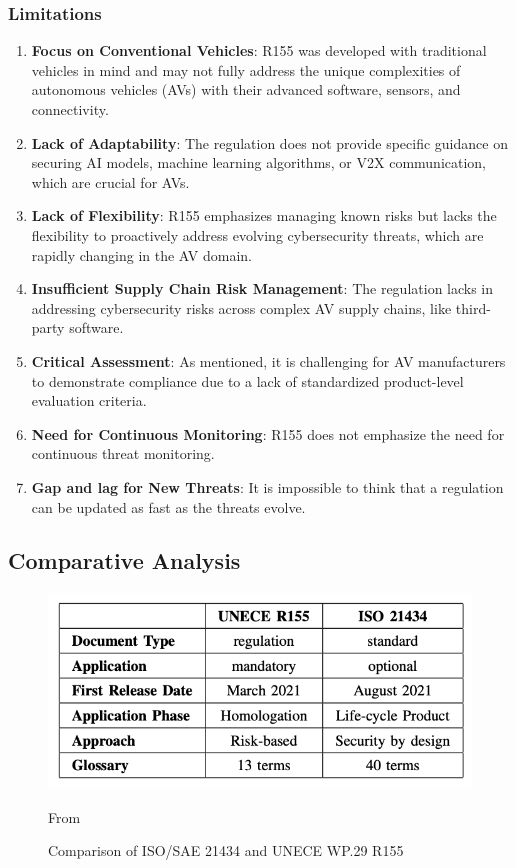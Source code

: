 \subsubsection{Limitations}\label{subsubsec:limitations-2}
\begin{enumerate}
    \item \textbf{Focus on Conventional Vehicles}: R155 was developed with traditional vehicles in mind and may not fully address the unique complexities of autonomous vehicles (AVs) with their advanced software, sensors, and connectivity.
    \item \textbf{Lack of Adaptability}: The regulation does not provide specific guidance on securing AI models, machine learning algorithms, or V2X communication, which are crucial for AVs.
    \item \textbf{Lack of Flexibility}: R155 emphasizes managing known risks but lacks the flexibility to proactively address evolving cybersecurity threats, which are rapidly changing in the AV domain.
    \item \textbf{Insufficient Supply Chain Risk Management}: The regulation lacks in addressing cybersecurity risks across complex AV supply chains, like third-party software.
    \item \textbf{Critical Assessment}: As mentioned, it is challenging for AV manufacturers to demonstrate compliance due to a lack of standardized product-level evaluation criteria.
    \item \textbf{Need for Continuous Monitoring}: R155 does not emphasize the need for continuous threat monitoring.
    \item \textbf{Gap and lag for New Threats}: It is impossible to think that a regulation can be updated as fast as the threats evolve.
\end{enumerate}


\subsection{Comparative Analysis}\label{subsec:comparative-analysis}
\begin{figure}[!htb]
    \centering
    \includegraphics[width=0.7\linewidth]{figures/diff-standards}
    \caption{Comparison of ISO/SAE 21434 and UNECE WP.29 R155}
    \footnotesize{From \cite{comparison-standard} }
    \label{fig:comparison}
\end{figure}

